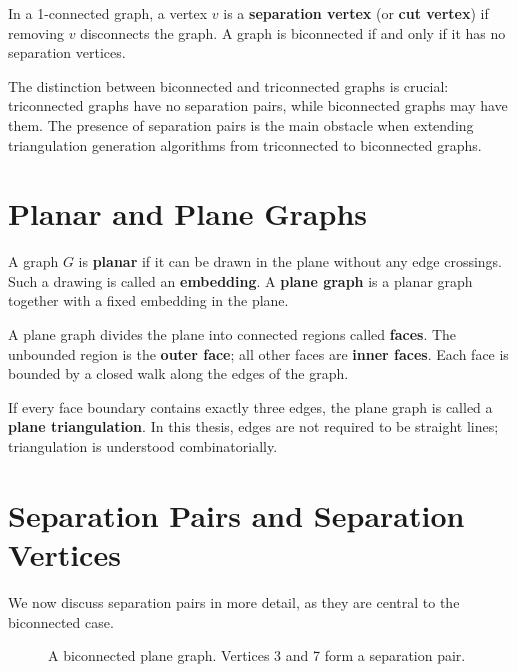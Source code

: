 \begin{definition}
    \label{def:separation_vertex}
    In a 1-connected graph, a vertex \(v\) is a \textbf{separation vertex} (or \textbf{cut vertex}) if removing \(v\) disconnects the graph. 
    A graph is biconnected if and only if it has no separation vertices.
\end{definition}

The distinction between biconnected and triconnected graphs is crucial: 
triconnected graphs have no separation pairs, while biconnected graphs may have them. 
The presence of separation pairs is the main obstacle when extending triangulation generation algorithms from triconnected to biconnected graphs.

\section{Planar and Plane Graphs}
\label{sec:planar_plane}

A graph \(G\) is \textbf{planar} if it can be drawn in the plane without any edge crossings. 
Such a drawing is called an \textbf{embedding}. 
A \textbf{plane graph} is a planar graph together with a fixed embedding in the plane.

A plane graph divides the plane into connected regions called \textbf{faces}. 
The unbounded region is the \textbf{outer face}; all other faces are \textbf{inner faces}. 
Each face is bounded by a closed walk along the edges of the graph.

If every face boundary contains exactly three edges, the plane graph is called a \textbf{plane triangulation}. 
In this thesis, edges are not required to be straight lines; triangulation is understood combinatorially.

\section{Separation Pairs and Separation Vertices}
\label{sec:separation_pairs_vertices}

We now discuss separation pairs in more detail, as they are central to the biconnected case.

\begin{figure}[htbp]
    \centering
    \caption{A biconnected plane graph. Vertices 3 and 7 form a separation pair.}
    \label{fig:separation_pair_example}
\end{figure}

